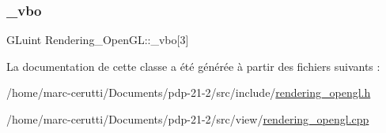 \mbox{\label{class_rendering___open_g_l_ade7eb98ac80d30c4611389027a2ed568}} 
\subsubsection{\texorpdfstring{\+\_\+vbo}{\_vbo}}
{\footnotesize\ttfamily G\+Luint Rendering\+\_\+\+Open\+G\+L\+::\+\_\+vbo\mbox{[}3\mbox{]}\hspace{0.3cm}{\ttfamily [private]}}



La documentation de cette classe a été générée à partir des fichiers suivants \+:\begin{DoxyCompactItemize}
\item 
/home/marc-\/cerutti/\+Documents/pdp-\/21-\/2/src/include/\hyperlink{rendering__opengl_8h}{rendering\+\_\+opengl.\+h}\item 
/home/marc-\/cerutti/\+Documents/pdp-\/21-\/2/src/view/\hyperlink{rendering__opengl_8cpp}{rendering\+\_\+opengl.\+cpp}\end{DoxyCompactItemize}
